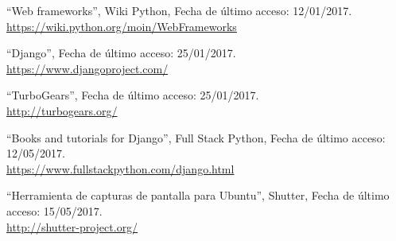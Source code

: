 

``Web frameworks'', Wiki Python, Fecha de último acceso: 12/01/2017.\\\href{https://wiki.python.org/moin/WebFrameworks}{https://wiki.python.org/moin/WebFrameworks}

``Django'', Fecha de último acceso: 25/01/2017.\\\href{https://www.djangoproject.com/}{https://www.djangoproject.com/}

``TurboGears'', Fecha de último acceso: 25/01/2017.\\\href{http://turbogears.org/}{http://turbogears.org/}

``Books and tutorials for Django'', Full Stack Python, Fecha de último acceso: 12/05/2017.\\\href{https://www.fullstackpython.com/django.html}{https://www.fullstackpython.com/django.html}

``Herramienta de capturas de pantalla para Ubuntu'', Shutter, Fecha de último acceso: 15/05/2017.\\\href{http://shutter-project.org/}{http://shutter-project.org/}

